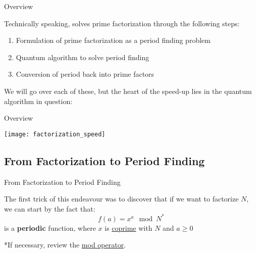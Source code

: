 \documentclass[aspectratio=43]{beamer}
\begin{document}
\begin{frame}{\sa Overview}
    \begin{card}
        Technically speaking, \sa solves prime factorization through the following steps:
        
        \begin{enumerate}
            \item Formulation of prime factorization as a period finding problem
            \item Quantum algorithm to solve period finding
            \item Conversion of period back into prime factors
        \end{enumerate}
        
        We will go over each of these, but the heart of the speed-up lies in the quantum algorithm in question: \textbf{\qft}
    \end{card}
\pagenumber
\end{frame}

\begin{frame}{\sa Overview}
    \begin{card}
        \begin{center}
            \texttt{[image: factorization\_speed]}
        \end{center}
    \end{card}
\pagenumber
\end{frame}


\subsection{From Factorization to Period Finding}
\begin{frame}{From Factorization to Period Finding}
    \begin{card}
        The first trick of this endeavour was to discover that if we want to factorize $N$, we can start by the fact that:
        \begin{equation*}
            f(a) = x^a \mod N^*
        \end{equation*}
        is a \textbf{periodic} function, where $x$ is \href{https://en.wikipedia.org/wiki/Coprime_integers}{coprime} with $N$ and $a \geqslant 0$
    \end{card}
    \begin{card}
        *If necessary, review the \href{https://www.khanacademy.org/computing/computer-science/cryptography/modarithmetic/a/what-is-modular-arithmetic}{mod operator}.
    \end{card}
\pagenumber
\end{frame}
\end{document}
